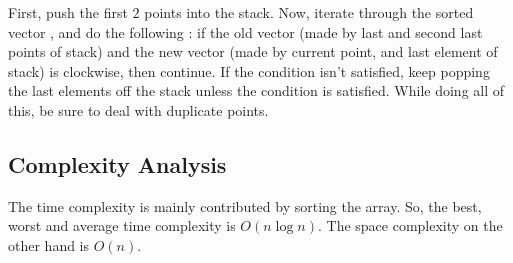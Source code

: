 First, push the first $2$ points into the stack. Now, iterate through the sorted vector , and do the following : if the old vector (made by last and second last points of stack) and the new vector (made by current point, and last element of stack) is clockwise, then continue. If the condition isn't satisfied, keep popping the last elements off the stack unless the condition is satisfied. While doing all of this, be sure to deal with duplicate points.

\subsection{Complexity Analysis}
The time complexity is mainly contributed by sorting the array. So, the best, worst and average time complexity is $O(n \log n)$. The space complexity on the other hand is $O(n)$.